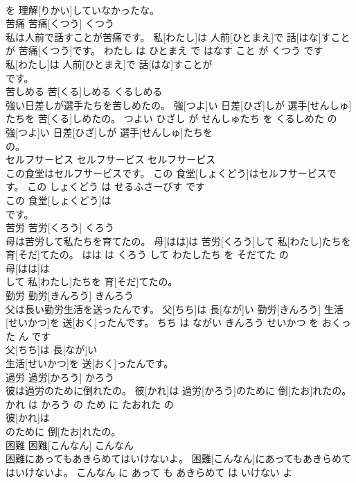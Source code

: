 \documentclass[8pt]{extreport}
\begin{document}
\begin{CJK}{UTF8}{min}
\\	を 理解[りかい]していなかったな。			
\\	苦痛	苦痛[くつう]	くつう	
\\	私は人前で話すことが苦痛です。	私[わたし]は 人前[ひとまえ]で 話[はな]すことが 苦痛[くつう]です。	わたし は ひとまえ で はなす こと が くつう です	
\\	私[わたし]は 人前[ひとまえ]で 話[はな]すことが
\\	です。			
\\	苦しめる	苦[くる]しめる	くるしめる	
\\	強い日差しが選手たちを苦しめたの。	強[つよ]い 日差[ひざ]しが 選手[せんしゅ]たちを 苦[くる]しめたの。	つよい ひざし が せんしゅたち を くるしめた の	
\\	強[つよ]い 日差[ひざ]しが 選手[せんしゅ]たちを
\\	の。			
\\	セルフサービス	セルフサービス	セルフサービス	
\\	この食堂はセルフサービスです。	この 食堂[しょくどう]はセルフサービスです。	この しょくどう は せるふさーびす です	
\\	この 食堂[しょくどう]は
\\	です。			
\\	苦労	苦労[くろう]	くろう	
\\	母は苦労して私たちを育てたの。	母[はは]は 苦労[くろう]して 私[わたし]たちを 育[そだ]てたの。	はは は くろう して わたしたち を そだてた の	
\\	母[はは]は
\\	して 私[わたし]たちを 育[そだ]てたの。			
\\	勤労	勤労[きんろう]	きんろう	
\\	父は長い勤労生活を送ったんです。	父[ちち]は 長[なが]い 勤労[きんろう] 生活[せいかつ]を 送[おく]ったんです。	ちち は ながい きんろう せいかつ を おくった ん です	
\\	父[ちち]は 長[なが]い
\\	生活[せいかつ]を 送[おく]ったんです。			
\\	過労	過労[かろう]	かろう	
\\	彼は過労のために倒れたの。	彼[かれ]は 過労[かろう]のために 倒[たお]れたの。	かれ は かろう の ため に たおれた の	
\\	彼[かれ]は
\\	のために 倒[たお]れたの。			
\\	困難	困難[こんなん]	こんなん	
\\	困難にあってもあきらめてはいけないよ。	困難[こんなん]にあってもあきらめてはいけないよ。	こんなん に あって も あきらめて は いけない よ	

\end{CJK}
\end{document}
